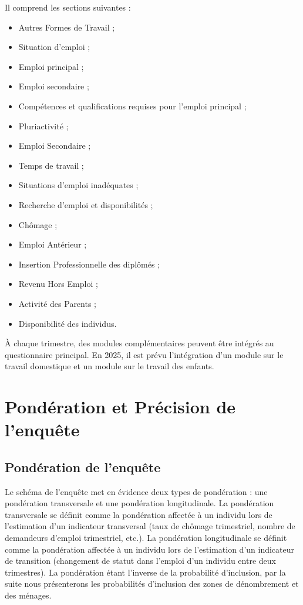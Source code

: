 \documentclass[12pt, a4paper]{article}
\begin{document}
Il comprend les sections suivantes :
\begin{itemize}[noitemsep]
  \item Autres Formes de Travail ;
  \item Situation d'emploi ;
  \item Emploi principal ;
  \item Emploi secondaire ;
  \item Compétences et qualifications requises pour l'emploi principal ;
  \item Pluriactivité ;
  \item Emploi Secondaire ;
  \item Temps de travail ;
  \item Situations d'emploi inadéquates ;
  \item Recherche d'emploi et disponibilités ;
  \item Chômage ;
  \item Emploi Antérieur ;
  \item Insertion Professionnelle des diplômés ;
  \item Revenu Hors Emploi ;
  \item Activité des Parents ;
  \item Disponibilité des individus.
\end{itemize}

À chaque trimestre, des modules complémentaires peuvent être intégrés au questionnaire principal. En 2025, il est prévu l'intégration d'un module sur le travail domestique et un module sur le travail des enfants.

\section{Pondération et Précision de l'enquête}

\subsection{Pondération de l'enquête}

Le schéma de l'enquête met en évidence deux types de pondération : une pondération transversale et une pondération longitudinale. La pondération transversale se définit comme la pondération affectée à un individu lors de l'estimation d'un indicateur transversal (taux de chômage trimestriel, nombre de demandeurs d'emploi trimestriel, etc.). La pondération longitudinale se définit comme la pondération affectée à un individu lors de l'estimation d'un indicateur de transition (changement de statut dans l'emploi d'un individu entre deux trimestres). La pondération étant l'inverse de la probabilité d'inclusion, par la suite nous présenterons les probabilités d'inclusion des zones de dénombrement et des ménages.
\end{document}
